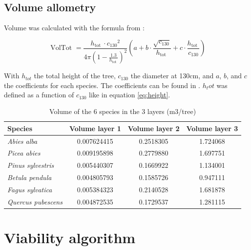 \documentclass{article}
\begin{document}
\subsection{Volume allometry}

Volume was calculated with the formula from  \autocite{deleuzeEstimerVolumeTotal2014} :

\begin{equation}
    \text { VolTot }=\frac{h_{\text {tot }} \cdot c_{130}{ }^2}{4 \pi\left(1-\frac{1.3}{h_{\text {tot }}}\right)^2}\left(a+b \cdot \frac{\sqrt{c_{130}}}{h_{\text {tot }}}+c \cdot \frac{h_{\text {tot }}}{c_{130}}\right)
\end{equation}

With $h_{tot}$ the total height of the tree, $c_{130}$ the diameter at 130cm, and $a$, $b$, and $c$ the coefficients for each species. The coefficients can be found in  \autocite{deleuzeEstimerVolumeTotal2014}. $h_tot$ was defined as a function of $c_{130}$ like in equation \ref{eq:height}. 

\begin{table}[]
    \centering
    \begin{tabular}{lccc}
    \hline
    \hline
    \textbf{Species} & \textbf{Volume layer 1} & \textbf{Volume layer 2} & \textbf{Volume layer 3} \\
    \hline
    \textit{Abies alba} & 0.007624415 & 0.2518305 & 1.724068 \\
    \textit{Picea abies} & 0.009195898 & 0.2779880 & 1.697751 \\
    \textit{Pinus sylvestris} & 0.005440307 & 0.1669922 & 1.134001 \\
    \textit{Betula pendula} & 0.004805793 & 0.1585726 & 0.947111 \\
    \textit{Fagus sylvatica} & 0.005384323 & 0.2140528 & 1.681878 \\
    \textit{Quercus pubescens} & 0.004872535 & 0.1729537 & 1.281115 \\
    \hline
    \hline
    \end{tabular}
    \caption{Volume of the 6 species in the 3 layers (m3/tree)}
    \label{tab:volume}
\end{table}

\clearpage

\section{Viability algorithm}
\end{document}
